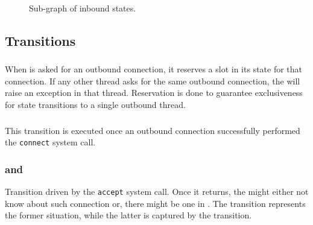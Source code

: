 \begin{figure}[p]
{}
  \caption{Sub-graph of inbound states.}
  \label{fig:statediagram-inbound-only}
\end{figure}


\subsection{Transitions}


\subsubsection{\Reserve{}}
When \connmngr{} is asked for an outbound connection, it reserves a slot
in its state for that connection.  If any other thread asks for the same
outbound connection, the \connmngr{} will raise an exception in that thread.
Reservation is done to guarantee exclusiveness for state transitions to
a single outbound thread.

\subsubsection{\Connected{}}
This transition is executed once an outbound connection successfully performed the
\texttt{connect} system call.

\subsubsection{\Accepted{} and \Overwritten{}}
Transition driven by the \texttt{accept} system call. Once it returns, the
\connmngr{} might either not know about such connection or, there might be one
in \ReservedOutboundState{}. The \Accepted{} transition represents the former
situation, while the latter is captured by the \Overwritten{} transition.

